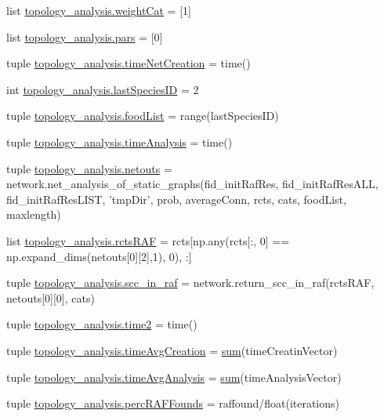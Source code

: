 \begin{DoxyCompactItemize}
\item 
list \hyperlink{a00159_a67cf979bfd8cf26867524a1a788a5e63}{topology\+\_\+analysis.\+weight\+Cat} = \mbox{[}1\mbox{]}
\item 
list \hyperlink{a00159_a516f339905d01b02a4e16181f2fde4be}{topology\+\_\+analysis.\+pars} = \mbox{[}0\mbox{]}
\item 
tuple \hyperlink{a00159_a2f85d448268dd44ad47f66b65bfa45b6}{topology\+\_\+analysis.\+time\+Net\+Creation} = time()
\item 
int \hyperlink{a00159_a1aa5d59ebf308accb3c960b5fd90a445}{topology\+\_\+analysis.\+last\+Species\+I\+D} = 2
\item 
tuple \hyperlink{a00159_a96850fa3d62df1176a8d7a5b988f4a32}{topology\+\_\+analysis.\+food\+List} = range(last\+Species\+I\+D)
\item 
tuple \hyperlink{a00159_ace5bda70ff24e6a220afb4438240003a}{topology\+\_\+analysis.\+time\+Analysis} = time()
\item 
tuple \hyperlink{a00159_af42f57da8ba80463f419efaf0f6f2c33}{topology\+\_\+analysis.\+netouts} = network.\+net\+\_\+analysis\+\_\+of\+\_\+static\+\_\+graphs(fid\+\_\+init\+Raf\+Res, fid\+\_\+init\+Raf\+Res\+A\+L\+L, fid\+\_\+init\+Raf\+Res\+L\+I\+S\+T, 'tmp\+Dir', prob, average\+Conn, rcts, cats, food\+List, maxlength)
\item 
list \hyperlink{a00159_aeb909c76682b690cc5ab6aca5ac37c4d}{topology\+\_\+analysis.\+rcts\+R\+A\+F} = rcts\mbox{[}np.\+any(rcts\mbox{[}\+:, 0\mbox{]} == np.\+expand\+\_\+dims(netouts\mbox{[}0\mbox{]}\mbox{[}2\mbox{]},1), 0), \+:\mbox{]}
\item 
tuple \hyperlink{a00159_ac864e2a75b705766c1d81f68897f52c0}{topology\+\_\+analysis.\+scc\+\_\+in\+\_\+raf} = network.\+return\+\_\+scc\+\_\+in\+\_\+raf(rcts\+R\+A\+F, netouts\mbox{[}0\mbox{]}\mbox{[}0\mbox{]}, cats)
\item 
tuple \hyperlink{a00159_a44666efa43bfc08ab8305c8d325f7456}{topology\+\_\+analysis.\+time2} = time()
\item 
tuple \hyperlink{a00159_a4cd61f10a5a0a8d80608e71a1fc2009c}{topology\+\_\+analysis.\+time\+Avg\+Creation} = \hyperlink{a00106_a59a869fb2b28d56dacd91c09e1dffc8d}{sum}(time\+Creatin\+Vector)
\item 
tuple \hyperlink{a00159_a0689e49982e7bedba8ac4eb5534963db}{topology\+\_\+analysis.\+time\+Avg\+Analysis} = \hyperlink{a00106_a59a869fb2b28d56dacd91c09e1dffc8d}{sum}(time\+Analysis\+Vector)
\item 
tuple \hyperlink{a00159_a51a66ce80f70aeab8bde70af9960e419}{topology\+\_\+analysis.\+perc\+R\+A\+F\+Founds} = raffound/float(iterations)

\end{DoxyCompactItemize}

